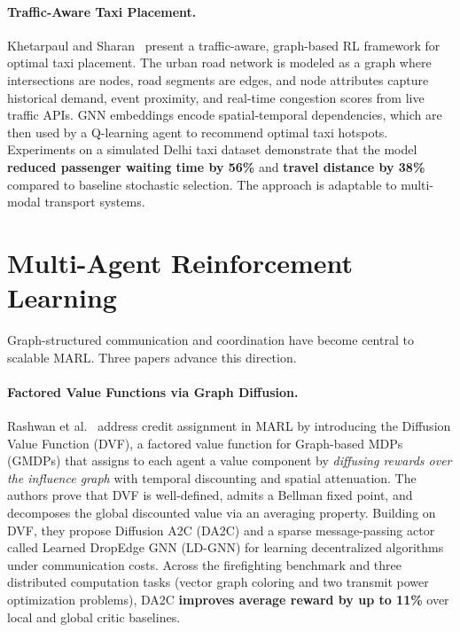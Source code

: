 \documentclass{article}
\begin{document}
\paragraph{Traffic-Aware Taxi Placement.}
Khetarpaul and Sharan~\cite{taxi2026} present a traffic-aware, graph-based RL framework for optimal taxi placement. The urban road network is modeled as a graph where intersections are nodes, road segments are edges, and node attributes capture historical demand, event proximity, and real-time congestion scores from live traffic APIs. GNN embeddings encode spatial-temporal dependencies, which are then used by a Q-learning agent to recommend optimal taxi hotspots. Experiments on a simulated Delhi taxi dataset demonstrate that the model \textbf{reduced passenger waiting time by 56\%} and \textbf{travel distance by 38\%} compared to baseline stochastic selection. The approach is adaptable to multi-modal transport systems.

\section{Multi-Agent Reinforcement Learning}
\label{sec:marl}

Graph-structured communication and coordination have become central to scalable MARL. Three papers advance this direction.

\paragraph{Factored Value Functions via Graph Diffusion.}
Rashwan et al.~\cite{factored2026} address credit assignment in MARL by introducing the Diffusion Value Function (DVF), a factored value function for Graph-based MDPs (GMDPs) that assigns to each agent a value component by \textit{diffusing rewards over the influence graph} with temporal discounting and spatial attenuation. The authors prove that DVF is well-defined, admits a Bellman fixed point, and decomposes the global discounted value via an averaging property. Building on DVF, they propose Diffusion A2C (DA2C) and a sparse message-passing actor called Learned DropEdge GNN (LD-GNN) for learning decentralized algorithms under communication costs. Across the firefighting benchmark and three distributed computation tasks (vector graph coloring and two transmit power optimization problems), DA2C \textbf{improves average reward by up to 11\%} over local and global critic baselines.
\end{document}

